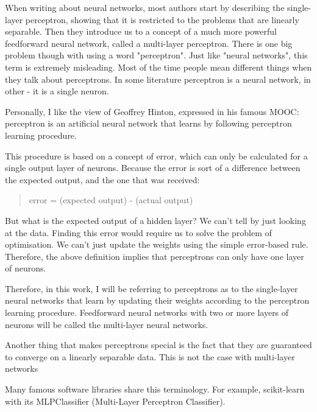 When writing about neural networks, most authors start by describing the single-layer perceptron, showing that it is restricted to the problems that are linearly separable. Then they introduce us to a concept of a much more powerful feedforward neural network, called a multi-layer perceptron. There is one big problem though with using a word "perceptron". Just like "neural networks", this term is extremely misleading. Most of the time people mean different things when they talk about perceptrons. In some literature perceptron is a neural network, in other - it is a single neuron.

Personally, I like the view of Geoffrey Hinton, expressed in his famous MOOC: perceptron is an artificial neural network that learns by following perceptron learning procedure.

This procedure is based on a concept of error, which can only be calculated for a single output layer of neurons. Because the error is sort of a difference between the expected output, and the one that was received:

\begin{quote}
error = (expected output) - (actual output)
\end{quote}

But what is the expected output of a hidden layer? We can't tell by just looking at the data. Finding this error would require us to solve the problem of optimisation. We can't just update the weights using the simple error-based rule. Therefore, the above definition implies that perceptrons can only have one layer of neurons.

Therefore, in this work, I will be referring to perceptrons as to the single-layer neural networks that learn by updating their weights according to the perceptron learning procedure. Feedforward neural networks with two or more layers of neurons will be called the multi-layer neural networks.

Another thing that makes perceptrons special is the fact that they are guaranteed to converge on a linearly separable data. This is not the case with multi-layer networks

Many famous software libraries share this terminology. For example, scikit-learn with its MLPClassifier (Multi-Layer Perceptron Classifier).
